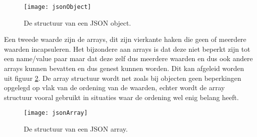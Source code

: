 \begin{figure}[h]
    \centering
\texttt{[image: jsonObject]}
\caption[JSON Object]{De structuur van een JSON object.}
    \label{fig:jsonObject}
\end{figure}

Een tweede waarde zijn de arrays, dit zijn vierkante haken die geen of meerdere waarden incapsuleren. Het bijzondere aan arrays is dat deze niet beperkt zijn tot een name/value paar maar dat deze zelf dus meerdere waarden en dus ook andere arrays kunnen bevatten en dus genest kunnen worden. Dit kan afgeleid worden uit figuur \ref{fig:jsonArray}. De array structuur wordt net zoals bij objecten geen beperkingen opgelegd op vlak van de ordening van de waarden, echter wordt de array structuur vooral gebruikt in situaties waar de ordening wel enig belang heeft.

\begin{figure}[h]
    \centering
    \texttt{[image: jsonArray]}
    \caption[JSON Array]{De structuur van een JSON array.}
    \label{fig:jsonArray}
\end{figure}






